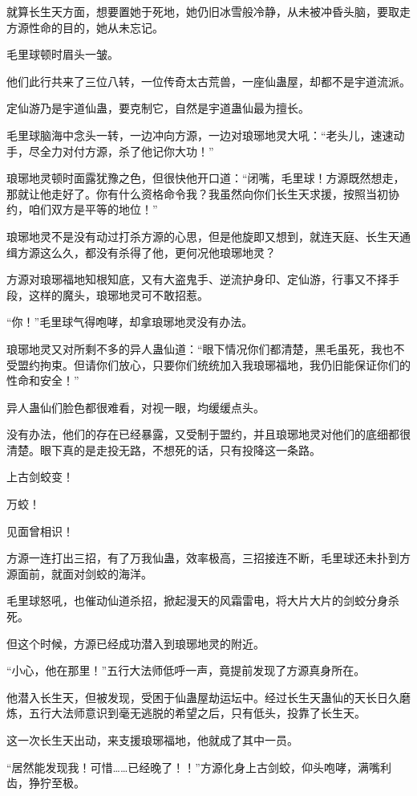 \begin{this_body}
就算长生天方面，想要置她于死地，她仍旧冰雪般冷静，从未被冲昏头脑，要取走方源性命的目的，她从未忘记。

毛里球顿时眉头一皱。

他们此行共来了三位八转，一位传奇太古荒兽，一座仙蛊屋，却都不是宇道流派。

定仙游乃是宇道仙蛊，要克制它，自然是宇道蛊仙最为擅长。

毛里球脑海中念头一转，一边冲向方源，一边对琅琊地灵大吼：“老头儿，速速动手，尽全力对付方源，杀了他记你大功！”

琅琊地灵顿时面露犹豫之色，但很快他开口道：“闭嘴，毛里球！方源既然想走，那就让他走好了。你有什么资格命令我？我虽然向你们长生天求援，按照当初协约，咱们双方是平等的地位！”

琅琊地灵不是没有动过打杀方源的心思，但是他旋即又想到，就连天庭、长生天通缉方源这么久，都没有杀得了他，更何况他琅琊地灵？

方源对琅琊福地知根知底，又有大盗鬼手、逆流护身印、定仙游，行事又不择手段，这样的魔头，琅琊地灵可不敢招惹。

“你！”毛里球气得咆哮，却拿琅琊地灵没有办法。

琅琊地灵又对所剩不多的异人蛊仙道：“眼下情况你们都清楚，黑毛虽死，我也不受盟约拘束。但请你们放心，只要你们统统加入我琅琊福地，我仍旧能保证你们的性命和安全！”

异人蛊仙们脸色都很难看，对视一眼，均缓缓点头。

没有办法，他们的存在已经暴露，又受制于盟约，并且琅琊地灵对他们的底细都很清楚。眼下真的是走投无路，不想死的话，只有投降这一条路。

上古剑蛟变！

万蛟！

见面曾相识！

方源一连打出三招，有了万我仙蛊，效率极高，三招接连不断，毛里球还未扑到方源面前，就面对剑蛟的海洋。

毛里球怒吼，也催动仙道杀招，掀起漫天的风霜雷电，将大片大片的剑蛟分身杀死。

但这个时候，方源已经成功潜入到琅琊地灵的附近。

“小心，他在那里！”五行大法师低呼一声，竟提前发现了方源真身所在。

他潜入长生天，但被发现，受困于仙蛊屋劫运坛中。经过长生天蛊仙的天长日久磨炼，五行大法师意识到毫无逃脱的希望之后，只有低头，投靠了长生天。

这一次长生天出动，来支援琅琊福地，他就成了其中一员。

“居然能发现我！可惜……已经晚了！！”方源化身上古剑蛟，仰头咆哮，满嘴利齿，狰狞至极。


\end{this_body}

